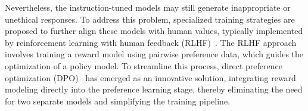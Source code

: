 Nevertheless, the instruction-tuned models may still generate inappropriate or unethical responses.
To address this problem, specialized training strategies are proposed to further align these models with human values, typically implemented by reinforcement learning with human feedback (RLHF)~\cite{DBLP:journals/corr/abs-1909-08593,DBLP:conf/nips/StiennonO0ZLVRA20,DBLP:conf/nips/Ouyang0JAWMZASR22}.
The RLHF approach involves training a reward model using pairwise preference data, which guides the optimization of a policy model.
To streamline this process, direct preference optimization (DPO)~\cite{DBLP:conf/nips/RafailovSMMEF23} has emerged as an innovative solution, integrating reward modeling directly into the preference learning stage, thereby eliminating the need for two separate models and simplifying the training pipeline.   
\comment{%


}


